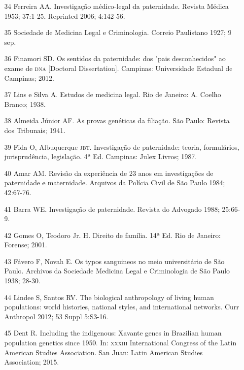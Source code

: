 \documentclass{article}
\begin{document}
\begin{itemize}
\item[34] Ferreira AA. Investigação médico-legal da paternidade. Revista
Médica 1953; 37:1-25. Reprinted 2006; 4:142-56.

\item[35] Sociedade de Medicina Legal e Criminologia. Correio Paulistano
1927; 9 sep.

\item[36] Finamori SD. Os sentidos da paternidade: dos "pais desconhecidos"
ao exame de \textsc{dna} [Doctoral Dissertation]. Campinas: Universidade Estadual de
Campinas; 2012.

\item[37] Lins e Silva A. Estudos de medicina legal. Rio de Janeiro: A.
Coelho Branco; 1938.

\item[38] Almeida Júnior AF. As provas genéticas da filiação. São Paulo:
Revista dos Tribunais; 1941.

\item[39] Fida O, Albuquerque \textsc{jbt}. Investigação de paternidade: teoria,
formulários, jurisprudência, legislação. 4ª Ed. Campinas: Julex Livros; 1987.

\item[40] Amar AM. Revisão da experiência de 23 anos em investigações de
paternidade e maternidade. Arquivos da Polícia Civil de São Paulo 1984;
42:67-76.

\item[41] Barra WE. Investigação de paternidade. Revista do Advogado 1988;
25:66-9.

\item[42] Gomes O, Teodoro Jr. H. Direito de família. 14ª Ed. Rio de
Janeiro: Forense; 2001.

\item[43] Fávero F, Novah E. Os typos sanguineos no meio universitário de
São Paulo. Archivos da Sociedade Medicina Legal e Criminologia de São Paulo
1938; 28-30.

\item[44] Lindee S, Santos RV. The biological anthropology of living human
populations: world histories, national styles, and international networks. Curr
Anthropol 2012; 53 Suppl 5:S3-16.

\item[45] Dent R. Including the indigenous: Xavante genes in Brazilian human
population genetics since 1950. In: \textsc{xxxiii} International Congress of the Latin
American Studies Association. San Juan: Latin American Studies Association;
2015.


\end{itemize}
\end{document}
